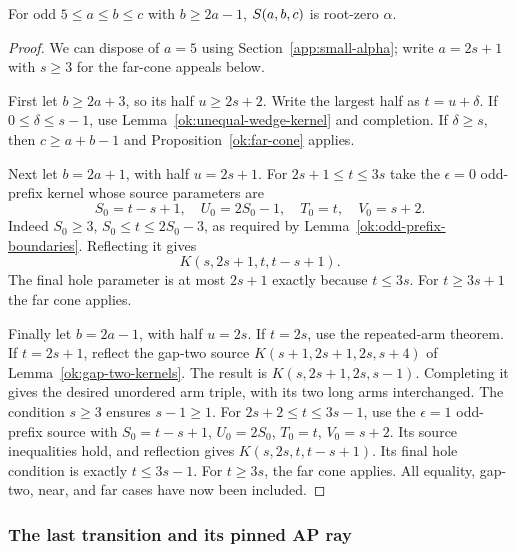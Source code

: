 \begin{proposition}
\label{ok:short-wedges}
For odd $5\le a\le b\le c$ with $b\ge2a-1$,
$S\!\left(a,b,c\right)$ is root-zero $\alpha$.
\end{proposition}
\begin{proof}
We can dispose of $a=5$ using Section~\ref{app:small-alpha};
write $a=2s+1$ with $s\ge3$ for the far-cone appeals below.

First let $b\ge2a+3$, so its half $u\ge2s+2$.
Write the largest half as $t=u+\delta$.
If $0\le\delta\le s-1$, use
Lemma~\ref{ok:unequal-wedge-kernel} and completion.
If $\delta\ge s$, then $c\ge a+b-1$ and
Proposition~\ref{ok:far-cone} applies.

Next let $b=2a+1$, with half $u=2s+1$.
For $2s+1\le t\le3s$ take the $\epsilon=0$ odd-prefix kernel
whose source parameters are
\[
 S_0=t-s+1,\quad U_0=2S_0-1,\quad T_0=t,\quad V_0=s+2.
 \]
Indeed $S_0\ge3$, $S_0\le t\le2S_0-3$,
as required by Lemma~\ref{ok:odd-prefix-boundaries}.
Reflecting it gives
\[
 K(s,2s+1,t,t-s+1).
 \]
The final hole parameter is at most $2s+1$ exactly because
$t\le3s$. For $t\ge3s+1$ the far cone applies.

Finally let $b=2a-1$, with half $u=2s$.
If $t=2s$, use the repeated-arm theorem.
If $t=2s+1$, reflect the gap-two source
$K(s+1,2s+1,2s,s+4)$ of
Lemma~\ref{ok:gap-two-kernels}. The result is
$K(s,2s+1,2s,s-1)$.
Completing it gives the desired unordered arm triple, with its two
long arms interchanged. The condition $s\ge3$ ensures $s-1\ge1$.
For $2s+2\le t\le3s-1$, use the $\epsilon=1$ odd-prefix source
with $S_0=t-s+1$, $U_0=2S_0$, $T_0=t$, $V_0=s+2$.
Its source inequalities hold, and reflection gives
$K(s,2s,t,t-s+1)$. Its final hole condition is exactly
$t\le3s-1$. For $t\ge3s$, the far cone applies.
All equality, gap-two, near, and far cases have now been included.
\end{proof}

\subsubsection{The last transition and its pinned AP ray}

